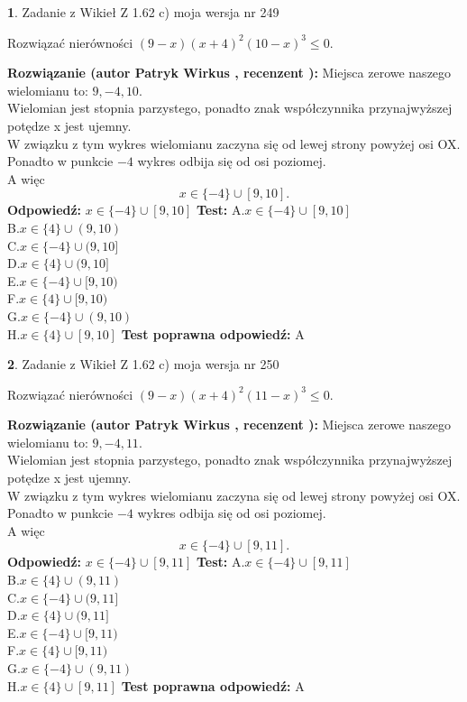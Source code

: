 \documentclass[12pt, a4paper]{article}
\theoremstyle{definition} %
\newtheorem{zad}{}
\newcommand{\zadStart}[1]{\begin{zad}#1\newline}
\newcommand{\zadStop}{\end{zad}}
\newcommand{\rozwStart}[2]{\noindent \textbf{Rozwiązanie (autor #1 , recenzent #2): }\newline}
\newcommand{\rozwStop}{\newline}
\newcommand{\odpStart}{\noindent \textbf{Odpowiedź:}\newline}
\newcommand{\odpStop}{\newline}
\newcommand{\testStart}{\noindent \textbf{Test:}\newline}
\newcommand{\testStop}{\newline}
\newcommand{\kluczStart}{\noindent \textbf{Test poprawna odpowiedź:}\newline}
\newcommand{\kluczStop}{\newline}
\begin{document}
\zadStart{Zadanie z Wikieł Z 1.62 c) moja wersja nr 249}

Rozwiązać nierówności $(9-x)(x+4)^{2}(10-x)^{3}\le0$.
\zadStop
\rozwStart{Patryk Wirkus}{}
Miejsca zerowe naszego wielomianu to: $9, -4, 10$.\\
Wielomian jest stopnia parzystego, ponadto znak współczynnika przy\linebreak najwyższej potędze x jest ujemny.\\ W związku z tym wykres wielomianu zaczyna się od lewej strony powyżej osi OX.\\
Ponadto w punkcie $-4$ wykres odbija się od osi poziomej.\\
A więc $$x \in \{-4\} \cup [9,10].$$
\rozwStop
\odpStart
$x \in \{-4\} \cup [9,10]$
\odpStop
\testStart
A.$x \in \{-4\} \cup [9,10]$\\
B.$x \in \{4\} \cup (9,10)$\\
C.$x \in \{-4\} \cup (9,10]$\\
D.$x \in \{4\} \cup (9,10]$\\
E.$x \in \{-4\} \cup [9,10)$\\
F.$x \in \{4\} \cup [9,10)$\\
G.$x \in \{-4\} \cup (9,10)$\\
H.$x \in \{4\} \cup [9,10]$
\testStop
\kluczStart
A
\kluczStop



\zadStart{Zadanie z Wikieł Z 1.62 c) moja wersja nr 250}

Rozwiązać nierówności $(9-x)(x+4)^{2}(11-x)^{3}\le0$.
\zadStop
\rozwStart{Patryk Wirkus}{}
Miejsca zerowe naszego wielomianu to: $9, -4, 11$.\\
Wielomian jest stopnia parzystego, ponadto znak współczynnika przy\linebreak najwyższej potędze x jest ujemny.\\ W związku z tym wykres wielomianu zaczyna się od lewej strony powyżej osi OX.\\
Ponadto w punkcie $-4$ wykres odbija się od osi poziomej.\\
A więc $$x \in \{-4\} \cup [9,11].$$
\rozwStop
\odpStart
$x \in \{-4\} \cup [9,11]$
\odpStop
\testStart
A.$x \in \{-4\} \cup [9,11]$\\
B.$x \in \{4\} \cup (9,11)$\\
C.$x \in \{-4\} \cup (9,11]$\\
D.$x \in \{4\} \cup (9,11]$\\
E.$x \in \{-4\} \cup [9,11)$\\
F.$x \in \{4\} \cup [9,11)$\\
G.$x \in \{-4\} \cup (9,11)$\\
H.$x \in \{4\} \cup [9,11]$
\testStop
\kluczStart
A
\kluczStop
\end{document}
